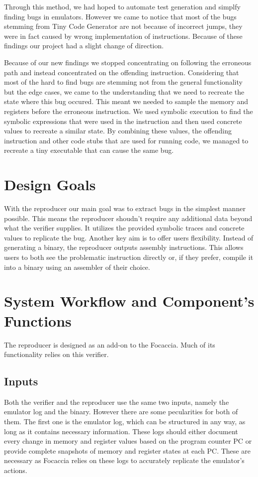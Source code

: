 Through this method, we had hoped to automate test generation and simplfy finding bugs in emulators.
However we came to notice that most of the bugs stemming from Tiny Code Generator are not because of incorrect jumps, they were in fact caused by wrong implementation of instructions.
Because of these findings our project had a slight change of direction.

Because of our new findings we stopped concentrating on following the erroneous path and instead concentrated on the offending instruction.
Considering that most of the hard to find bugs are stemming not from the general functionality but the edge cases, we came to the understanding that we need to recreate the state where this bug occured.
This meant we needed to sample the memory and registers before the erroneous instruction.
We used symbolic execution to find the symbolic expressions that were used in the instruction and then used concrete values to recreate a similar state.
By combining these values, the offending instruction and other code stubs that are used for running code, we managed to recreate a tiny executable that can cause the same bug.

\section{Design Goals}
With the reproducer our main goal was to extract bugs in the simplest manner possible.
This means the reproducer shoudn't require any additional data beyond what the verifier supplies.
It utilizes the provided symbolic traces and concrete values to replicate the bug.
Another key aim is to offer users flexibility.
Instead of generating a binary, the reproducer outputs assembly instructions.
This allows users to both see the problematic instruction directly or, if they prefer, compile it into a binary using an assembler of their choice.

\section{System Workflow and Component's Functions}
The reproducer is designed as an add-on to the Focaccia.
Much of its functionality relies on this verifier.

\subsection{Inputs}
Both the verifier and the reproducer use the same two inputs, namely the emulator log and the binary.
However there are some pecularities for both of them.
The first one is the emulator log, which can be structured in any way, as long as it contains necessary information.
These logs should either document every change in memory and register values based on the program counter \ac{PC} or provide complete snapshots of memory and register states at each PC.
These are necessary as Focaccia relies on these logs to accurately replicate the emulator's actions.

